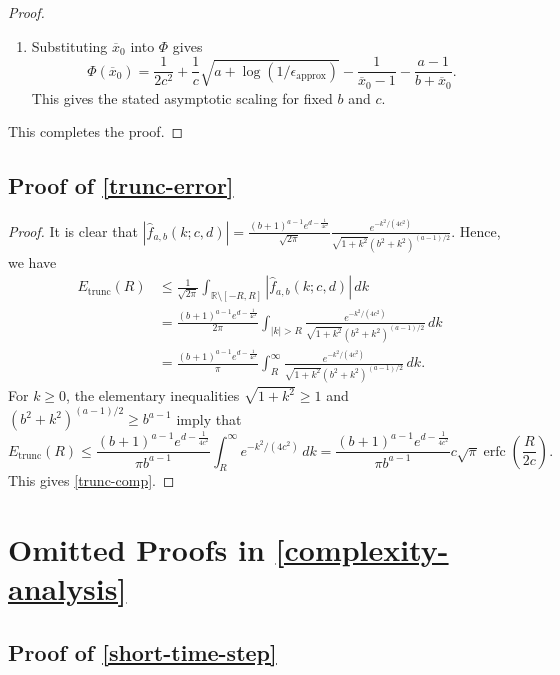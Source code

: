 \documentclass[10pt,reqno]{article}
\numberwithin{equation}{section}
\theoremstyle{plain}
\theoremstyle{definition}
\begin{document}
\begin{proof}
\begin{enumerate}
    \item Substituting \(\overline x_0\) into \(\Phi\) gives
    \begin{equation}
    \Phi(\overline x_0) = \frac{1}{2c^2}+\frac{1}{c}\sqrt{a+\log(1/\epsilon_{\operatorname{approx}})}-\frac{1}{\overline x_0-1}-\frac{a-1}{b+\overline x_0}.
    \end{equation}
    This gives the stated asymptotic scaling for fixed \(b\) and \(c\).
\end{enumerate}
This completes the proof.
\end{proof}

\subsection{Proof of \cref{trunc-error}}\label{proof-of-trunc-error}

\begin{proof}
It is clear that \(|\hat f_{a,b}(k;c,d)| = \frac{(b+1)^{a-1}e^{d-\frac{1}{4c^2}}}{\sqrt{2\pi}}\frac{e^{-k^2/(4c^2)}}{\sqrt{1+k^2}(b^2+k^2)^{(a-1)/2}}\). Hence, we have
\begin{align}
E_{\mathrm{trunc}}(R) &\leq \frac{1}{\sqrt{2\pi}}\int_{\mathbb R\setminus[-R,R]}|\hat f_{a,b}(k;c,d)|\,dk \\
&= \frac{(b+1)^{a-1}e^{d-\frac{1}{4c^2}}}{2\pi}\int_{|k|>R}\frac{e^{-k^2/(4c^2)}}{\sqrt{1+k^2}(b^2+k^2)^{(a-1)/2}}\,dk \\
&= \frac{(b+1)^{a-1}e^{d-\frac{1}{4c^2}}}{\pi}\int_R^\infty\frac{e^{-k^2/(4c^2)}}{\sqrt{1+k^2}(b^2+k^2)^{(a-1)/2}}\,dk.
\end{align}
For \(k\geq 0\), the elementary inequalities \(\sqrt{1+k^2}\geq 1\) and \((b^2+k^2)^{(a-1)/2}\geq b^{a-1}\) imply that
\begin{equation}
E_{\mathrm{trunc}}(R) \leq \frac{(b+1)^{a-1}e^{d-\frac{1}{4c^2}}}{\pi b^{a-1}}\int_R^\infty e^{-k^2/(4c^2)}\,dk = \frac{(b+1)^{a-1}e^{d-\frac{1}{4c^2}}}{\pi b^{a-1}}c\sqrt{\pi}\operatorname{erfc}\left(\frac{R}{2c}\right).
\end{equation}
This gives \cref{trunc-comp}.
\end{proof}


\section{Omitted Proofs in \cref{complexity-analysis}}

\subsection{Proof of \cref{short-time-step}}\label{proof-of-short-time-step}
\end{document}
